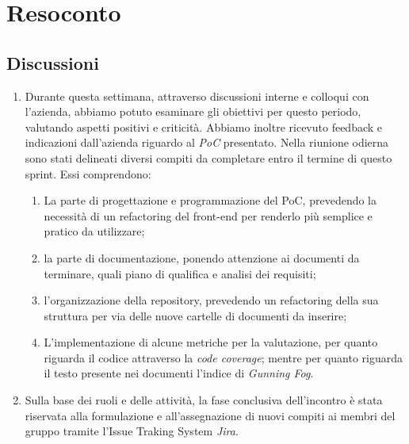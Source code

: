\section{Resoconto} \label{sec:resoconto}
\subsection{Discussioni} \label{subsec:resdiscussione}
\begin{enumerate}
    \item Durante questa settimana, attraverso discussioni interne e colloqui con l'azienda, abbiamo potuto esaminare gli obiettivi per questo periodo, valutando aspetti positivi e criticità. Abbiamo inoltre ricevuto feedback e indicazioni dall'azienda riguardo al \emph{PoC} presentato. Nella riunione odierna sono stati delineati diversi compiti da completare entro il termine di questo sprint. Essi comprendono: 
    \begin{enumerate}
        \item La parte di progettazione e programmazione del PoC, prevedendo la necessità di un refactoring del front-end per renderlo più semplice e pratico da utilizzare; 
        \item la parte di documentazione, ponendo attenzione ai documenti da terminare, quali piano di qualifica e analisi dei requisiti;
        \item l'organizzazione della repository, prevedendo un refactoring della sua struttura per via delle nuove cartelle di documenti da inserire;
        \item L'implementazione di alcune metriche per la valutazione, per quanto riguarda il codice attraverso la \emph{code coverage}; mentre per quanto riguarda il testo presente nei documenti l'indice di \emph{Gunning Fog}. 
     \end{enumerate}

    \item Sulla base dei ruoli e delle attività, la fase conclusiva dell'incontro è stata riservata alla formulazione e all'assegnazione di nuovi compiti ai membri del gruppo tramite l'Issue Traking System \emph{Jira}.

\end{enumerate}


